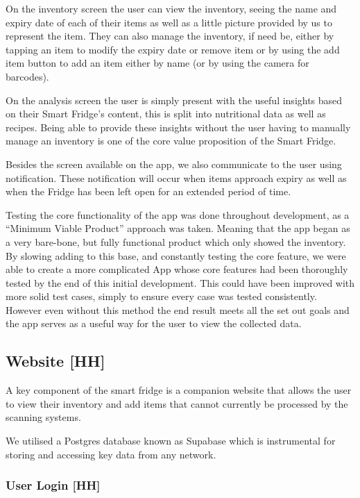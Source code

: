 On the inventory screen the user can view the inventory, seeing the name and expiry date of each of their items as well as a little picture provided by us to represent the item.
They can also manage the inventory, if need be, either by tapping an item to modify the expiry date or remove item or by using the add item button to add an item either by name (or by using the camera for barcodes).

On the analysis screen the user is simply present with the useful insights based on their Smart Fridge's content, this is split into nutritional data as well as recipes.
Being able to provide these insights without the user having to manually manage an inventory is one of the core value proposition of the Smart Fridge.

Besides the screen available on the app, we also communicate to the user using notification.
These notification will occur when items approach expiry as well as when the Fridge has been left open for an extended period of time.

Testing the core functionality of the app was done throughout development, as a “Minimum Viable Product” approach was taken.
Meaning that the app began as a very bare-bone, but fully functional product which only showed the inventory.
By slowing adding to this base, and constantly testing the core feature, we were able to create a more complicated App whose core features had been thoroughly tested by the end of this initial development.
This could have been improved with more solid test cases, simply to ensure every case was tested consistently.
However even without this method the end result meets all the set out goals and the app serves as a useful way for the user to view the collected data.

\subsection{Website [HH]}

A key component of the smart fridge is a companion website that allows the user to view their inventory and add items that cannot currently be processed by the scanning systems.

We utilised a Postgres database known as Supabase which is instrumental for storing and accessing key data from any network.

\subsubsection{User Login [HH]}

